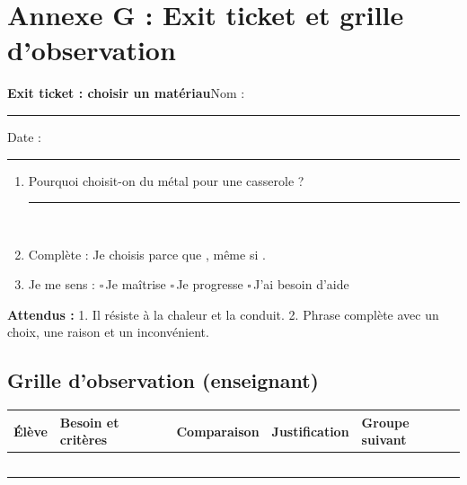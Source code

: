 \documentclass[11pt,a4paper]{article}
\newcommand{\cb}{$\square$\,}
\newcommand{\lig}{\noindent\rule{\linewidth}{0.3pt}\\[5mm]}
\newcommand{\entete}[2]{%
  \begin{tcolorbox}[colback=#1!10,colframe=#1!70!black,boxrule=0.8pt,arc=2mm]
  {\Large\bfseries #2}\hfill Nom : \rule{4cm}{0.3pt}\quad Date : \rule{2.2cm}{0.3pt}
  \end{tcolorbox}}
\begin{document}
\newpage
\section*{Annexe G : Exit ticket et grille d'observation}
\entete{gray}{Exit ticket : choisir un matériau}

\begin{enumerate}
 \item Pourquoi choisit-on du métal pour une casserole ?\\ \lig
 \item Complète : Je choisis \dotfill{} parce que \dotfill, même si \dotfill.
 \item Je me sens : \cb Je maîtrise \quad \cb Je progresse \quad \cb J'ai besoin d'aide
\end{enumerate}

\textbf{Attendus :} 1. Il résiste à la chaleur et la conduit. 2. Phrase complète avec un choix, une raison et un inconvénient.

\bigskip
\subsection*{Grille d'observation (enseignant)}
\begin{tabularx}{\linewidth}{Y p{2.4cm} p{2.4cm} p{2.4cm} Y}
\toprule
Élève & Besoin et critères & Comparaison & Justification & Groupe suivant\\
\midrule
 & & & & \\ & & & & \\ & & & & \\ & & & & \\ & & & & \\
\bottomrule
\end{tabularx}
\end{document}
